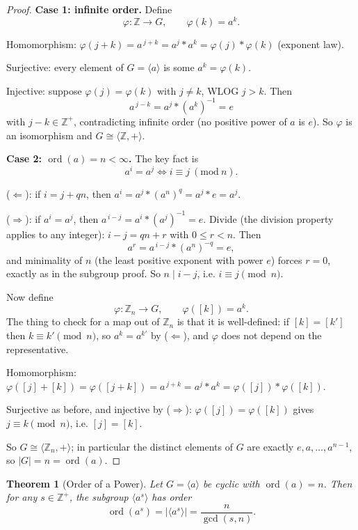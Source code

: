 \documentclass[11pt]{article}
\newcommand{\1}{\mathbf{1}}
\theoremstyle{notestyle}
\newtheorem{theorem}{Theorem}[section]
\theoremstyle{definition}
\begin{document}
\begin{proof}
\textbf{Case 1: infinite order.} Define
$$\varphi : \mathbb{Z} \to G, \qquad \varphi(k) = a^{k}.$$
\par Homomorphism: $\varphi(j + k) = a^{\,j + k} = a^{j} * a^{k} =
\varphi(j) * \varphi(k)$ (exponent law).
\par Surjective: every element of $G = \langle a \rangle$ is some $a^{k} = \varphi(k)$.
\par Injective: suppose $\varphi(j) = \varphi(k)$ with $j \ne k$, WLOG $j > k$. Then
$$a^{\,j - k} = a^{j} * (a^{k})^{-1} = e$$
with $j - k \in \mathbb{Z}^{+}$, contradicting infinite order (no positive power of
$a$ is $e$). So $\varphi$ is an isomorphism and $G \cong \langle \mathbb{Z},
+ \rangle$.
\par \textbf{Case 2: $\operatorname{ord}(a) = n < \infty$.} The key fact is
$$a^{i} = a^{j} \iff i \equiv j \ (\mathrm{mod}\ n).$$
\par ($\Leftarrow$): if $i = j + qn$, then $a^{i} = a^{j} * (a^{n})^{q} = a^{j} * e
= a^{j}$.
\par ($\Rightarrow$): if $a^{i} = a^{j}$, then $a^{\,i - j} = a^{i} * (a^{j})^{-1} =
e$. Divide (the division property applies to any integer):
$i - j = qn + r$ with $0 \le r < n$. Then
$$a^{r} = a^{\,i - j} * (a^{n})^{-q} = e,$$
and minimality of $n$ (the least positive exponent with power $e$) forces $r = 0$,
exactly as in the subgroup proof. So $n \mid i - j$, i.e. $i \equiv j \pmod n$.
\par Now define
$$\varphi : \mathbb{Z}_n \to G, \qquad \varphi([k]) = a^{k}.$$
The thing to check for a map out of $\mathbb{Z}_n$ is that it is well-defined:
if $[k] = [k']$ then $k \equiv k' \pmod n$, so $a^{k} = a^{k'}$ by
($\Leftarrow$), and $\varphi$ does not depend on the representative.
\par Homomorphism: $\varphi([j] + [k]) = \varphi([j + k]) = a^{\,j + k} = a^{j} *
a^{k} = \varphi([j]) * \varphi([k])$.
\par Surjective as before, and injective by ($\Rightarrow$):
$\varphi([j]) = \varphi([k])$ gives $j \equiv k \pmod n$, i.e. $[j] = [k]$.
\par So $G \cong \langle \mathbb{Z}_n, + \rangle$; in particular the distinct
elements of $G$ are exactly $e, a, \dots, a^{n - 1}$, so $|G| = n =
\operatorname{ord}(a)$.
\end{proof}
\begin{theorem}[Order of a Power]
\label{thm:order-of-power}
Let $G = \langle a \rangle$ be cyclic with $\operatorname{ord}(a) = n$. Then
for any $s \in \mathbb{Z}^{+}$, the subgroup $\langle a^{s} \rangle$ has order
$$\operatorname{ord}(a^{s}) = \left|\langle a^{s} \rangle\right| =
\frac{n}{\gcd(s, n)}.$$
\end{theorem}
\end{document}
